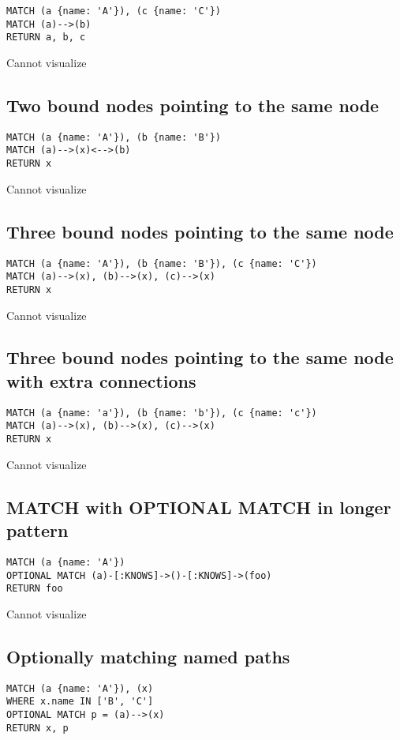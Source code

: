 \begin{lstlisting}
MATCH (a {name: 'A'}), (c {name: 'C'})
MATCH (a)-->(b)
RETURN a, b, c
\end{lstlisting}

Cannot visualize
\subsection{Two bound nodes pointing to the same node}

\begin{lstlisting}
MATCH (a {name: 'A'}), (b {name: 'B'})
MATCH (a)-->(x)<-->(b)
RETURN x
\end{lstlisting}

Cannot visualize
\subsection{Three bound nodes pointing to the same node}

\begin{lstlisting}
MATCH (a {name: 'A'}), (b {name: 'B'}), (c {name: 'C'})
MATCH (a)-->(x), (b)-->(x), (c)-->(x)
RETURN x
\end{lstlisting}

Cannot visualize
\subsection{Three bound nodes pointing to the same node with extra connections}

\begin{lstlisting}
MATCH (a {name: 'a'}), (b {name: 'b'}), (c {name: 'c'})
MATCH (a)-->(x), (b)-->(x), (c)-->(x)
RETURN x
\end{lstlisting}

Cannot visualize
\subsection{MATCH with OPTIONAL MATCH in longer pattern}

\begin{lstlisting}
MATCH (a {name: 'A'})
OPTIONAL MATCH (a)-[:KNOWS]->()-[:KNOWS]->(foo)
RETURN foo
\end{lstlisting}

Cannot visualize
\subsection{Optionally matching named paths}

\begin{lstlisting}
MATCH (a {name: 'A'}), (x)
WHERE x.name IN ['B', 'C']
OPTIONAL MATCH p = (a)-->(x)
RETURN x, p
\end{lstlisting}

